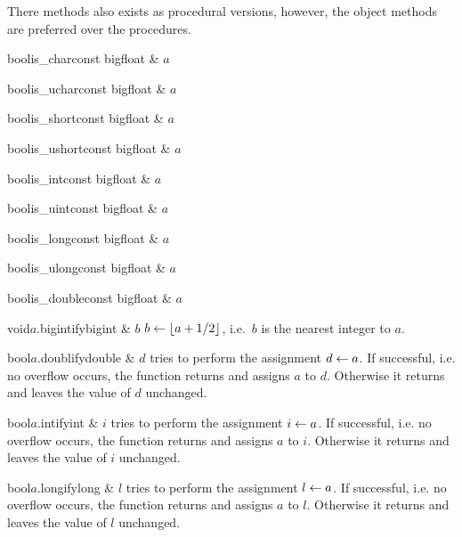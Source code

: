 There methods also exists as procedural versions, however, the object methods are preferred over
the procedures.
\begin{fcode}{bool}{is_char}{const bigfloat & $a$}\end{fcode}
\begin{fcode}{bool}{is_uchar}{const bigfloat & $a$}\end{fcode}
\begin{fcode}{bool}{is_short}{const bigfloat & $a$}\end{fcode}
\begin{fcode}{bool}{is_ushort}{const bigfloat & $a$}\end{fcode}
\begin{fcode}{bool}{is_int}{const bigfloat & $a$}\end{fcode}
\begin{fcode}{bool}{is_uint}{const bigfloat & $a$}\end{fcode}
\begin{fcode}{bool}{is_long}{const bigfloat & $a$}\end{fcode}
\begin{fcode}{bool}{is_ulong}{const bigfloat & $a$}\end{fcode}
\begin{fcode}{bool}{is_double}{const bigfloat & $a$}\end{fcode}

\begin{cfcode}{void}{$a$.bigintify}{bigint & $b$}
  $b \leftarrow \lfloor a + 1/2 \rfloor$, i.e.~$b$ is the nearest integer to $a$.
\end{cfcode}

\begin{cfcode}{bool}{$a$.doublify}{double & $d$}
  tries to perform the assignment $d \leftarrow a$.  If successful, i.e. no overflow occurs, the function
  returns \FALSE and assigns $a$ to $d$.  Otherwise it returns \TRUE and leaves the value of $d$
  unchanged.
\end{cfcode}

\begin{cfcode}{bool}{$a$.intify}{int & $i$}
  tries to perform the assignment $i \leftarrow a$.  If successful, i.e. no overflow occurs, the function
  returns \FALSE and assigns $a$ to $i$.  Otherwise it returns \TRUE and leaves the value of $i$
  unchanged.
\end{cfcode}

\begin{cfcode}{bool}{$a$.longify}{long & $l$}
  tries to perform the assignment $l \leftarrow a$.  If successful, i.e. no overflow occurs, the function
  returns \FALSE and assigns $a$ to $l$.  Otherwise it returns \TRUE and leaves the value of $l$
  unchanged.
\end{cfcode}


